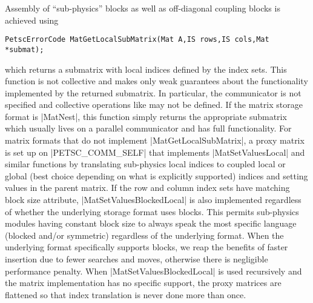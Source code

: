 Assembly of ``sub-physics'' blocks as well as off-diagonal coupling blocks is achieved using
\begin{verbatim}
PetscErrorCode MatGetLocalSubMatrix(Mat A,IS rows,IS cols,Mat *submat);
\end{verbatim}
which returns a submatrix with local indices defined by the index sets.
This function is not collective and makes only weak guarantees about the functionality implemented by the returned submatrix.
In particular, the communicator is not specified and collective operations like {\MatMult} may not be defined.
If the matrix storage format is \cverb|MatNest|, this function simply returns the appropriate submatrix which usually lives on a parallel communicator and has full functionality.
For matrix formats that do not implement \cverb|MatGetLocalSubMatrix|, a proxy matrix is set up on \cverb|PETSC_COMM_SELF| that implements \cverb|MatSetValuesLocal| and similar functions by translating sub-physics local indices to coupled local or global (best choice depending on what is explicitly supported) indices and setting values in the parent matrix.
If the row and column index sets have matching block size attribute, \cverb|MatSetValuesBlockedLocal| is also implemented regardless of whether the underlying storage format uses blocks.
This permits sub-physics modules having constant block size to always speak the most specific language (blocked and/or symmetric) regardless of the underlying format.
When the underlying format specifically supports blocks, we reap the benefits of faster insertion due to fewer searches and moves, otherwise there is negligible performance penalty.
When \cverb|MatSetValuesBlockedLocal| is used recursively and the matrix implementation has no specific support, the proxy matrices are flattened so that index translation is never done more than once.
